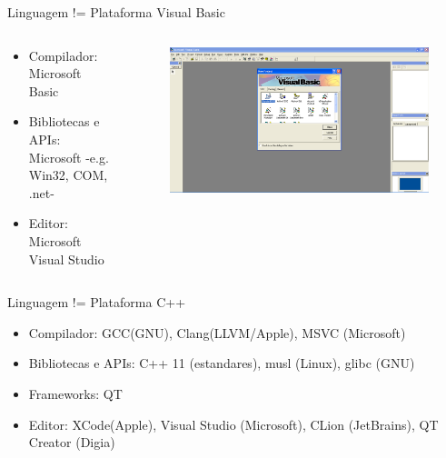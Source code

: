 \documentclass[aspectratio=169]{beamer}
\begin{document}
\begin{frame}{Linguagem != Plataforma}
    Visual Basic


    \begin{columns}[T] %
	     \begin{column}[T]{0.5\textwidth} %
            \begin{itemize}
            	\item Compilador: Microsoft Basic
                \item Bibliotecas e APIs: Microsoft -e.g. Win32, COM, .net-
                \item Editor: Microsoft Visual Studio
            \end{itemize}
	     \end{column}
	     \begin{column}[T]{7cm} %
      			\begin{figure}
      			\centering
      			\includegraphics[width=\linewidth]{Images/basic}
      			\end{figure}

	     \end{column}
     \end{columns}

\end{frame}

\begin{frame}{Linguagem != Plataforma}
    C++
	\begin{itemize}
	\item Compilador: GCC(GNU), Clang(LLVM/Apple), MSVC (Microsoft)
    \item Bibliotecas e APIs: C++ 11 (estandares), musl (Linux), glibc (GNU)
    \item Frameworks: QT
    \item Editor: XCode(Apple), Visual Studio (Microsoft), CLion (JetBrains), QT Creator (Digia)
	\end{itemize}
\end{frame}
\end{document}
